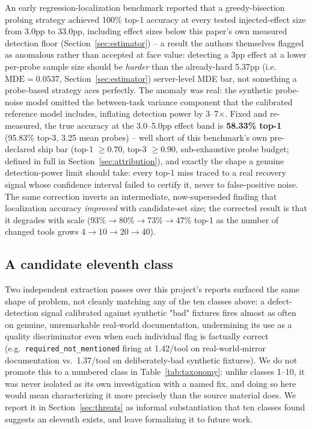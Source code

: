 \documentclass[11pt]{article}
\begin{document}
An early regression-localization benchmark reported that a greedy-bisection probing strategy
achieved 100\% top-1 accuracy at every tested injected-effect size from 3.0pp to 33.0pp, including
effect sizes below this paper's own measured detection floor (Section~\ref{sec:estimator}) -- a
result the authors themselves flagged as anomalous rather than accepted at face value: detecting a
3pp effect at a lower per-probe sample size should be \emph{harder} than the already-hard 5.37pp
(i.e.\ $\mathrm{MDE}=0.0537$, Section~\ref{sec:estimator})
server-level MDE bar, not something a probe-based strategy aces perfectly.
The anomaly was real: the synthetic probe-noise model omitted the between-task variance component
that the calibrated reference model includes, inflating detection power by 3--7$\times$. Fixed and
re-measured, the true accuracy at the 3.0--5.0pp effect band is \textbf{58.33\% top-1} (95.83\%
top-3, 3.25 mean probes) -- well short of this benchmark's own pre-declared ship bar (top-1
$\geq0.70$, top-3 $\geq0.90$, sub-exhaustive probe budget; defined in full in
Section~\ref{sec:attribution}), and exactly the shape a
genuine detection-power limit should take: every top-1 miss traced to a real recovery signal whose
confidence interval failed to certify it, never to false-positive noise.
The same correction inverts an intermediate, now-superseded finding that localization accuracy
\emph{improved} with candidate-set size; the corrected result is that it degrades with scale
(93\%$\to$80\%$\to$73\%$\to$47\% top-1 as the number of changed tools grows 4$\to$10$\to$20$\to$40).

\subsection{A candidate eleventh class}
Two independent extraction passes over this project's reports surfaced the same shape of problem,
not cleanly matching any of the ten classes above: a defect-detection signal calibrated against
synthetic "bad" fixtures fires almost as often on genuine, unremarkable real-world documentation,
undermining its use as a quality discriminator even when each individual flag is factually correct
(e.g.\ \texttt{required\_not\_mentioned} firing at 1.42/tool on real-world-mirror documentation
vs.\ 1.37/tool on deliberately-bad synthetic fixtures).
We do not promote this to a numbered class
in Table~\ref{tab:taxonomy}: unlike classes 1--10, it was never isolated as its own investigation
with a named fix, and doing so here would mean characterizing it more precisely than the source
material does. We report it in Section~\ref{sec:threats} as informal substantiation that ten
classes found suggests an eleventh exists, and leave formalizing it to future work.
\end{document}

